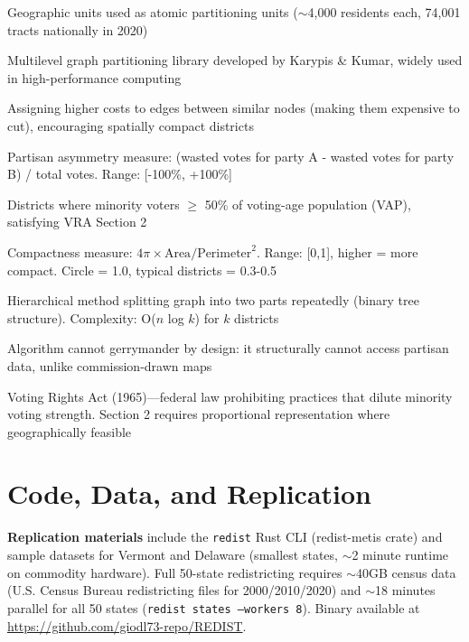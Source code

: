 \documentclass[11pt]{article}
\begin{document}
\begin{description}[leftmargin=2.5cm,style=nextline,noitemsep,topsep=4pt]
    \item[Census tracts] Geographic units used as atomic partitioning units ($\sim$4,000 residents each, 74,001 tracts nationally in 2020)
    \item[METIS] Multilevel graph partitioning library developed by Karypis \& Kumar, widely used in high-performance computing
    \item[Edge-weighted partitioning] Assigning higher costs to edges between similar nodes (making them expensive to cut), encouraging spatially compact districts
    \item[Efficiency gap (EG)] Partisan asymmetry measure: (wasted votes for party A - wasted votes for party B) / total votes. Range: [-100\%, +100\%]
    \item[Majority-minority (MM) districts] Districts where minority voters $\geq$ 50\% of voting-age population (VAP), satisfying VRA Section 2
    \item[Polsby-Popper (PP)] Compactness measure: $4\pi \times \text{Area} / \text{Perimeter}^2$. Range: [0,1], higher = more compact. Circle = 1.0, typical districts = 0.3-0.5
    \item[Recursive bisection] Hierarchical method splitting graph into two parts repeatedly (binary tree structure). Complexity: O($n$ log $k$) for $k$ districts
    \item[Impossibility defense] Algorithm cannot gerrymander by design: it structurally cannot access partisan data, unlike commission-drawn maps
    \item[VRA] Voting Rights Act (1965)---federal law prohibiting practices that dilute minority voting strength. Section 2 requires proportional representation where geographically feasible
\end{description}

\section*{Code, Data, and Replication}

\textbf{Replication materials} include the \texttt{redist} Rust CLI (redist-metis crate) and sample datasets for Vermont and Delaware (smallest states, $\sim$2 minute runtime on commodity hardware). Full 50-state redistricting requires $\sim$40GB census data (U.S. Census Bureau redistricting files for 2000/2010/2020) and $\sim$18 minutes parallel for all 50 states (\texttt{redist states --workers 8}). Binary available at \url{https://github.com/giodl73-repo/REDIST}.
\end{document}
